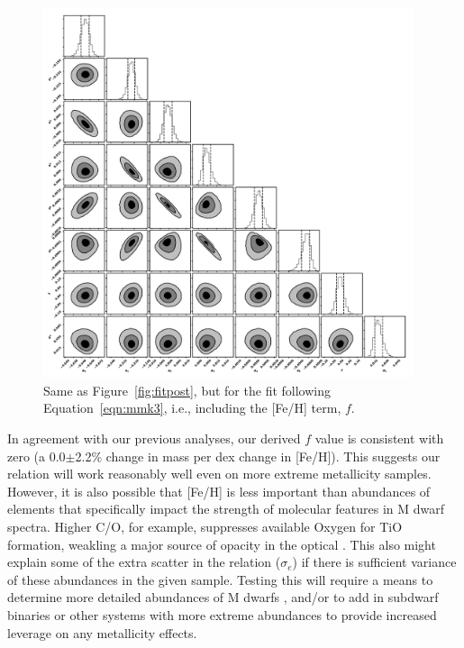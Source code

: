 \documentclass[twocolumn]{aastex62}
\begin{document}
\begin{figure}[p]
\begin{center}
\includegraphics[width=0.97\textwidth]{output_8feh_eMass.pdf}
\caption{Same as Figure~\ref{fig:fitpost}, but for the fit following Equation~\ref{eqn:mmk3}, i.e., including the [Fe/H] term, $f$. }
\label{fig:fitpost_feh}
\end{center}
\end{figure}

In agreement with our previous analyses, our derived $f$ value is consistent with zero (a 0.0$\pm$2.2\% change in mass per dex change in [Fe/H]). This suggests our relation will work reasonably well even on more extreme metallicity samples. However, it is also possible that [Fe/H] is less important than abundances of elements that specifically impact the strength of molecular features in M dwarf spectra. Higher C/O, for example, suppresses available Oxygen for TiO formation, weakling a major source of opacity in the optical \citep[e.g., C, O, Ti,][]{2012ApJ...747L..27F,2015ApJ...804...40G,Veyette2016a}. This also might explain some of the extra scatter in the relation ($\sigma_e$) if there is sufficient variance of these abundances in the given sample. Testing this will require a means to determine more detailed abundances of M dwarfs \citep[e.g.,][]{Veyette2017}, and/or to add in subdwarf binaries or other systems with more extreme abundances to provide increased leverage on any metallicity effects. 
\end{document}
